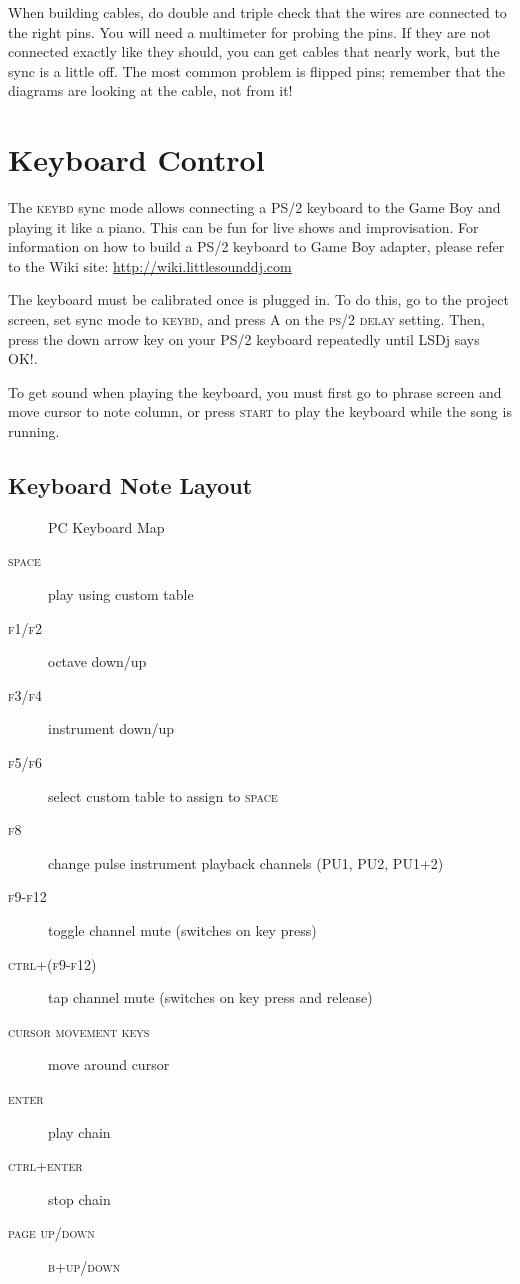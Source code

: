 When building cables, do double and triple check that the wires are connected to the right pins. You will need a multimeter for probing the pins. If they are not connected exactly like they should, you can get cables that nearly work, but the sync is a little off. The most common problem is flipped pins; remember that the diagrams are looking at the cable, not from it!

\section{Keyboard Control}

The \textsc{keybd} sync mode allows connecting a PS/2 keyboard to the Game Boy and playing it like a piano. This can be fun for live shows and improvisation. For information on how to build a PS/2 keyboard to Game Boy adapter, please refer to the Wiki site: \url{http://wiki.littlesounddj.com}

The keyboard must be calibrated once is plugged in. To do this, go to the project screen, set sync mode to \textsc{keybd}, and press \textsc{A} on the \textsc{ps/2 delay} setting. Then, press the down arrow key on your PS/2 keyboard repeatedly until LSDj says \textsc{OK!}.

To get sound when playing the keyboard, you must first go to phrase screen and move cursor to note column, or press \textsc{start} to play the keyboard while the song is running.

\subsection{Keyboard Note Layout}

\begin{figure}[htpb]
	\begin{center}
	\end{center}
	\caption{PC Keyboard Map}
	\label{fig:keybd-map}
\end{figure}

\begin{description}
\item[\textsc{space}] play using custom table
\item[\textsc{f1/f2}] octave down/up
\item[\textsc{f3/f4}] instrument down/up
\item[\textsc{f5/f6}] select custom table to assign to \textsc{space}
\item[\textsc{f8}] change pulse instrument playback channels (\textsc{PU1, PU2, PU1+2})
\item[\textsc{f9-f12}] toggle channel mute (switches on key press)
\item[\textsc{ctrl+(f9-f12)}] tap channel mute (switches on key press and release)
\item[\textsc{cursor movement keys}] move around cursor
\item[\textsc{enter}] play chain
\item[\textsc{ctrl+enter}] stop chain
\item[\textsc{page up/down}] \textsc{b+up/down}
\end{description}

